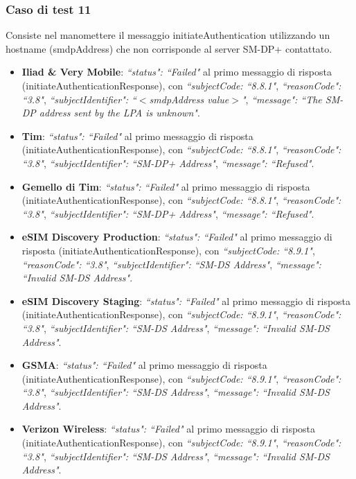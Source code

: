\documentclass[10pt, oneside]{book}
\begin{document}
\subsubsection{Caso di test 11}
Consiste nel manomettere il messaggio initiateAuthentication utilizzando un hostname (smdpAddress) che non corrisponde al server SM-DP+ contattato.
\begin{itemize}
\item \textbf{Iliad \& Very Mobile}: \textit{``status": ``Failed"} al primo messaggio di risposta (initiateAuthenticationResponse), con \textit{``subjectCode: ``8.8.1"}, \textit{``reasonCode": ``3.8"}, \textit{``subjectIdentifier": ``$<$smdpAddress value$>$"}, \textit{``message": ``The SM-DP address sent by the LPA is unknown"}.
\item \textbf{Tim}: \textit{``status": ``Failed"} al primo messaggio di risposta (initiateAuthenticationResponse), con \textit{``subjectCode: ``8.8.1"}, \textit{``reasonCode": ``3.8"}, \textit{``subjectIdentifier": ``SM-DP+ Address"}, \textit{``message": ``Refused"}.
\item \textbf{Gemello di Tim}:  \textit{``status": ``Failed"} al primo messaggio di risposta (initiateAuthenticationResponse), con \textit{``subjectCode: ``8.8.1"}, \textit{``reasonCode": ``3.8"}, \textit{``subjectIdentifier": ``SM-DP+ Address"}, \textit{``message": ``Refused"}.
\item \textbf{eSIM Discovery Production}: \textit{``status": ``Failed"} al primo messaggio di risposta (initiateAuthenticationResponse), con \textit{``subjectCode: ``8.9.1"}, \textit{``reasonCode": ``3.8"}, \textit{``subjectIdentifier": ``SM-DS Address"}, \textit{``message": ``Invalid SM-DS Address"}.
\item \textbf{eSIM Discovery Staging}: \textit{``status": ``Failed"} al primo messaggio di risposta (initiateAuthenticationResponse), con \textit{``subjectCode: ``8.9.1"}, \textit{``reasonCode": ``3.8"}, \textit{``subjectIdentifier": ``SM-DS Address"}, \textit{``message": ``Invalid SM-DS Address"}.
\item \textbf{GSMA}: \textit{``status": ``Failed"} al primo messaggio di risposta (initiateAuthenticationResponse), con \textit{``subjectCode: ``8.9.1"}, \textit{``reasonCode": ``3.8"}, \textit{``subjectIdentifier": ``SM-DS Address"}, \textit{``message": ``Invalid SM-DS Address"}.
\item \textbf{Verizon Wireless}: \textit{``status": ``Failed"} al primo messaggio di risposta (initiateAuthenticationResponse), con \textit{``subjectCode: ``8.9.1"}, \textit{``reasonCode": ``3.8"}, \textit{``subjectIdentifier": ``SM-DS Address"}, \textit{``message": ``Invalid SM-DS Address"}.

\end{itemize}
\end{document}
